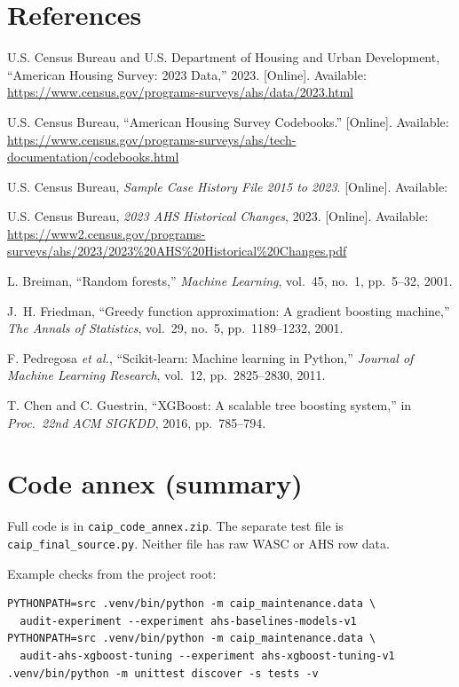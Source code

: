 \documentclass[11pt,a4paper]{article}
\begin{document}
\section*{References}
\begin{enumerate}[leftmargin=1.6em,itemsep=0.25em,label={[\arabic*]}]
  \item U.S. Census Bureau and U.S. Department of Housing and Urban Development, ``American Housing Survey: 2023 Data,'' 2023. [Online]. Available: \url{https://www.census.gov/programs-surveys/ahs/data/2023.html}
  \item U.S. Census Bureau, ``American Housing Survey Codebooks.'' [Online]. Available: \url{https://www.census.gov/programs-surveys/ahs/tech-documentation/codebooks.html}
  \item U.S. Census Bureau, \textit{Sample Case History File 2015 to 2023}. [Online]. Available: 
  \item U.S. Census Bureau, \textit{2023 AHS Historical Changes}, 2023. [Online]. Available: \url{https://www2.census.gov/programs-surveys/ahs/2023/2023\%20AHS\%20Historical\%20Changes.pdf}
  \item L. Breiman, ``Random forests,'' \textit{Machine Learning}, vol.~45, no.~1, pp.~5--32, 2001.
  \item J.~H. Friedman, ``Greedy function approximation: A gradient boosting machine,'' \textit{The Annals of Statistics}, vol.~29, no.~5, pp.~1189--1232, 2001.
  \item F. Pedregosa \textit{et al.}, ``Scikit-learn: Machine learning in Python,'' \textit{Journal of Machine Learning Research}, vol.~12, pp.~2825--2830, 2011.
  \item T. Chen and C. Guestrin, ``XGBoost: A scalable tree boosting system,'' in \textit{Proc.\ 22nd ACM SIGKDD}, 2016, pp.~785--794.
\end{enumerate}

\appendix
\section{Code annex (summary)}
Full code is in \texttt{caip\_code\_annex.zip}. The separate test file is \texttt{caip\_final\_source.py}. Neither file has raw WASC or AHS row data.

Example checks from the project root:

{\small
\begin{verbatim}
PYTHONPATH=src .venv/bin/python -m caip_maintenance.data \
  audit-experiment --experiment ahs-baselines-models-v1
PYTHONPATH=src .venv/bin/python -m caip_maintenance.data \
  audit-ahs-xgboost-tuning --experiment ahs-xgboost-tuning-v1
.venv/bin/python -m unittest discover -s tests -v
\end{verbatim}
}
\end{document}

